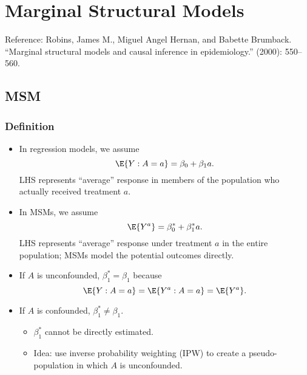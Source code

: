 \chapter{Marginal Structural Models}
Reference: Robins, James M., Miguel Angel Hernan, and Babette
Brumback. ``Marginal structural models and causal inference in
epidemiology.'' (2000): 550--560.
\section{MSM}
\subsection*{Definition}
\begin{itemize}
      \item In regression models, we assume
            \[ \E{Y\given A=a}=\beta_0+\beta_1a. \]
            LHS represents ``average'' response in members of the population who actually received treatment $ a $.
      \item In MSMs, we assume
            \[ \E{Y^a}=\beta_0^*+\beta_1^*a. \]
            LHS represents ``average'' response under treatment $a$ in the
            entire population; MSMs model the potential outcomes
            directly.
      \item If $ A $ is unconfounded, $ \beta_1^*=\beta_1 $ because
            \[ \E{Y\given A=a}=\E{Y^a\given A=a}=\E{Y^a}. \]
      \item If $ A $ is confounded, $ \beta_1^*\ne \beta_1 $.
            \begin{itemize}
                  \item $\beta_1^*$ cannot be directly estimated.
                  \item Idea: use inverse probability weighting (IPW) to create a
                        pseudo-population in which $A$ is unconfounded.
            \end{itemize}
\end{itemize}
